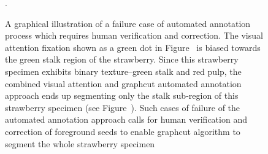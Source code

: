 \documentclass {udthesis}
\begin{document}
\begin{figure}
\begin{subfigure}[]{0.2\textwidth}
      \caption{}
      \label{fig:bad_seg_recursive_seg}
  \end{subfigure}
\caption[Illustration of failed automated annotation process flow]{A graphical illustration of a failure case of automated annotation process which requires human verification and correction. The visual attention fixation shown as a green dot in Figure~ is biased towards the green stalk region of the strawberry. Since this strawberry specimen exhibits binary texture--green stalk and red pulp, the combined visual attention and graphcut automated annotation approach ends up segmenting only the stalk sub-region of this strawberry specimen (see Figure~). Such cases of failure of the automated annotation approach calls for human verification and correction of foreground seeds to enable graphcut algorithm to segment the whole strawberry specimen}. 
\label{fig:annotation_bad_seg}
\end{figure}	
%
\end{document}
